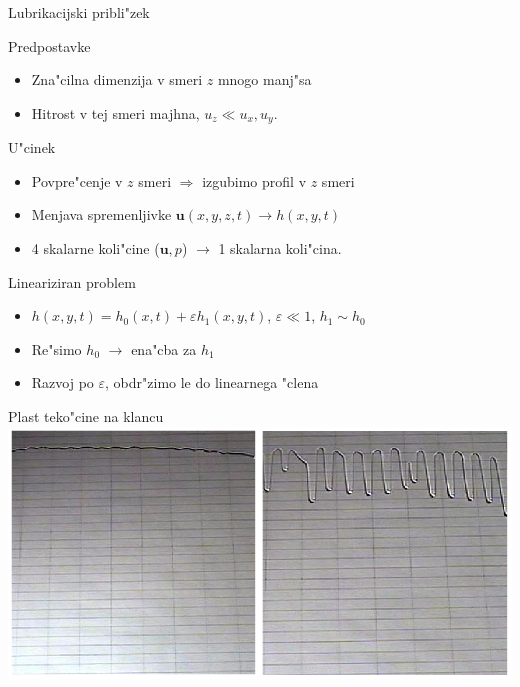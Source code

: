 \documentclass{beamer}
\renewcommand{\vec}{\mathbf}
\begin{document}
\begin{frame}{Lubrikacijski pribli"zek}
 \begin{block}{Predpostavke}
  \begin{itemize}
   \item Zna"cilna dimenzija v smeri $z$ mnogo manj"sa
   \item Hitrost v tej smeri majhna, $u_z \ll u_x, u_y$. 
  \end{itemize}
  \end{block}
  
  \begin{block}{U"cinek}
  \begin{itemize}
   \item Povpre"cenje v $z$ smeri $\Rightarrow$ izgubimo profil v $z$ smeri
   \item Menjava spremenljivke $\vec u(x,y,z,t) \to h(x,y,t)$
   \item 4 skalarne koli"cine ($\vec u, p$) $\to$ 1 skalarna koli"cina. 
   \end{itemize}
 \end{block}
\end{frame}

\begin{frame}{Lineariziran problem}
\begin{itemize}
 \item $ h(x,y,t) = h_0(x,t) + \varepsilon h_1(x,y,t) $, \; $\varepsilon \ll 1$, \; $h_1 \sim h_0$
 \item Re"simo $h_0$ $\rightarrow$ ena"cba za $h_1$
 \item Razvoj po $\varepsilon$, obdr"zimo le do linearnega "clena
\end{itemize}

\end{frame}

\begin{frame}{Plast teko"cine na klancu}
 \includegraphics[width=\textwidth]{./Slike/film-slika}
\end{frame}
\end{document}
